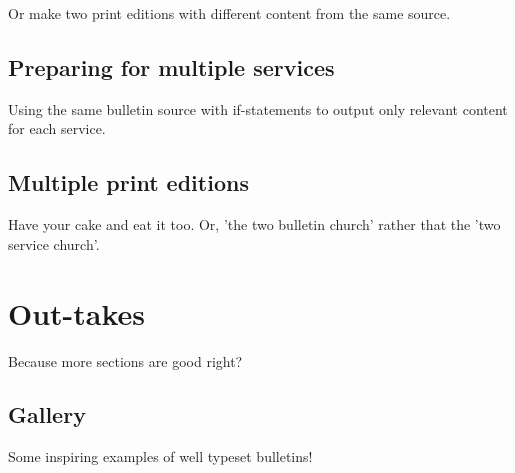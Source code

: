 \documentclass[12pt]{scrartcl}
\begin{document}
Or make two print editions with different content from the same source.

\subsection{Preparing for multiple services}

Using the same bulletin source with if-statements to output only relevant
content for each service.

\subsection{Multiple print editions}

Have your cake and eat it too. Or, 'the two bulletin church' rather that the
'two service church'.

\section{Out-takes}

Because more sections are good right?

\subsection{Gallery}

Some inspiring examples of well typeset bulletins!
\end{document}
